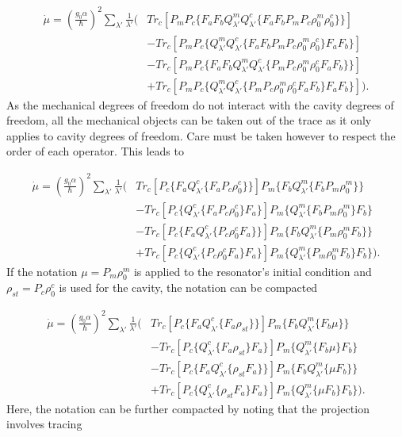 \documentclass[12pt]{article}
\begin{document}
\begin{align*}
    \dot{\mu} = (\frac{g_0 \alpha}{\hbar})^2 \sum_{\lambda'}\frac{1}{\lambda'}\Bigg(& Tr_c[P_mP_c\{F_a F_bQ^m_{\lambda'}Q^c_{\lambda'}\{F_a F_bP_mP_c\rho_0^m\rho_0^c\}\}]\\
    &-Tr_c[P_mP_c\{Q^m_{\lambda'}Q^c_{\lambda'}\{F_a F_bP_mP_c\rho_0^m\rho_0^c\}F_a F_b\}]\\
    &-Tr_c[P_mP_c\{F_a F_bQ^m_{\lambda'}Q^c_{\lambda'}\{P_mP_c\rho_0^m\rho_0^c F_a F_b\} \}]\\ &+Tr_c[P_mP_c\{Q^m_{\lambda'}Q^c_{\lambda'}\{P_mP_c\rho_0^m\rho_0^c F_a F_b\}F_a F_b\}] \Bigg).
\end{align*} As the mechanical degrees of freedom do not interact with the cavity degrees of freedom, all the mechanical objects can be taken out of the trace as it only applies to cavity degrees of freedom. Care must be taken however to respect the order of each operator. This leads to

\begin{align*}
    \dot{\mu} = (\frac{g_0 \alpha}{\hbar})^2 \sum_{\lambda'}\frac{1}{\lambda'}\Bigg(& Tr_c[P_c\{F_a Q^c_{\lambda'}\{F_a P_c\rho_0^c\}\}]P_m\{F_bQ^m_{\lambda'}\{F_bP_m\rho_0^m\}\}\\
    &-Tr_c[P_c\{Q^c_{\lambda'}\{F_a P_c\rho_0^c\}F_a \}]P_m\{Q^m_{\lambda'}\{F_bP_m\rho_0^m\}F_b\}\\
    &-Tr_c[P_c\{F_a Q^c_{\lambda'}\{P_c\rho_0^cF_a \} \}]P_m\{F_bQ^m_{\lambda'}\{ P_m\rho_0^mF_b\}\}\\ &+Tr_c[P_c\{Q^c_{\lambda'}\{P_c\rho_0^cF_a  \}F_a \}]P_m\{Q^m_{\lambda'}\{P_m\rho_0^mF_b\}F_b\} \Bigg).
\end{align*} If the notation $\mu=P_m\rho_0^m$ is applied to the resonator's initial condition and $\rho_{st}=P_c\rho_0^c$ is used for the cavity, the notation can be compacted

\begin{align*}
    \dot{\mu} = (\frac{g_0 \alpha}{\hbar})^2 \sum_{\lambda'}\frac{1}{\lambda'}\Bigg(& Tr_c[P_c\{F_a Q^c_{\lambda'}\{F_a \rho_{st}\}\}]P_m\{F_b Q^m_{\lambda'}\{F_b\mu\}\}\\
    &-Tr_c[P_c\{Q^c_{\lambda'}\{F_a \rho_{st}\}F_a \}]P_m\{Q^m_{\lambda'}\{F_b\mu\}F_b\}\\
    &-Tr_c[P_c\{F_a Q^c_{\lambda'}\{\rho_{st}F_a \} \}]P_m\{F_b Q^m_{\lambda'}\{ \mu F_b\}\}\\ &+Tr_c[P_c\{Q^c_{\lambda'}\{\rho_{st} F_a \}F_a \}]P_m\{Q^m_{\lambda'}\{\mu F_b\}F_b\} \Bigg).
\end{align*} Here, the notation can be further compacted by noting that the projection involves tracing
\end{document}
